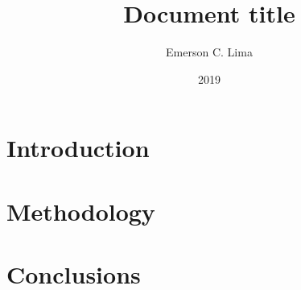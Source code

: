 \documentclass{article}
\title{Document title}
\date{2019}
\author{Emerson C. Lima}
\begin{document}
\maketitle

\section{Introduction}

\lipsum[1] \cite{back1993overview}
\lipsum[2]

\section{Methodology}

\lipsum[2]

\section{Conclusions}

\lipsum[2]

\printbibliography
\end{document}
